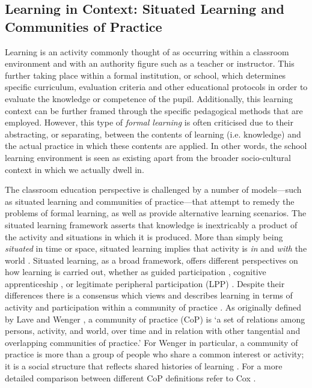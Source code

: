 \subsection{Learning in Context: Situated Learning and Communities of Practice}
Learning is an activity commonly thought of as occurring within a classroom environment and with an authority figure such as a teacher or instructor. This further taking place within a formal institution, or school, which determines specific curriculum, evaluation criteria and other educational protocols in order to evaluate the knowledge or competence of the pupil. Additionally, this learning context can be further framed through the specific pedagogical methods that are employed. However, this type of \textit{formal learning} is often criticised due to their abstracting, or separating, between the contents of learning (i.e. knowledge) and the actual practice in which these contents are applied. In other words, the school learning environment is seen as existing apart from the broader socio-cultural context in which we actually dwell in. 

The classroom education perspective is challenged by a number of models---such as situated learning and communities of practice---that attempt to remedy the problems of formal learning, as well as provide alternative learning scenarios. The situated learning framework \cite{Brown:1989,Lave:1991} asserts that knowledge is inextricably a product of the activity and situations in which it is produced. More than simply being \textit{situated} in time or space, situated learning implies that activity is \textit{in} and \textit{with} the world \cite{Lave:1991}. Situated learning, as a broad framework, offers different perspectives on how learning is carried out, whether as guided participation \cite{Rogoff:1995}, cognitive apprenticeship \cite{Brown:1989}, or legitimate peripheral participation (LPP) \cite{Lave:1991}. Despite their differences there is a consensus which views and describes learning in terms of activity and participation within a community of practice \cite{Rambusch:2005}. As originally defined by Lave and Wenger \cite[p.~98]{Lave:1991}, a community of practice (CoP) is `a set of relations among persons, activity, and world, over time and in relation with other tangential and overlapping communities of practice.' For Wenger in particular, a community of practice is more than a group of people who share a common interest or activity; it is a social structure that reflects shared histories of learning \cite{Wenger:1998}. For a more detailed comparison between different CoP definitions refer to Cox \cite{Cox:2005}.

